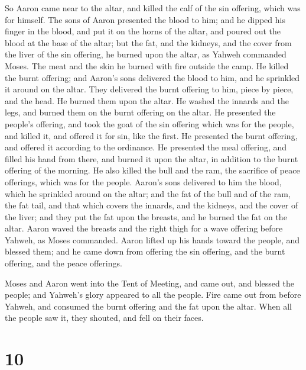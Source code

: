  So Aaron came near to the altar, and killed the calf of the
sin offering, which was for himself.  The sons of Aaron
presented the blood to him; and he dipped his finger in the blood, and
put it on the horns of the altar, and poured out the blood at the base
of the altar;  but the fat, and the kidneys, and the cover
from the liver of the sin offering, he burned upon the altar, as Yahweh
commanded Moses.  The meat and the skin he burned with fire
outside the camp.  He killed the burnt offering; and
Aaron's sons delivered the blood to him, and he sprinkled it around on
the altar.  They delivered the burnt offering to him, piece
by piece, and the head. He burned them upon the altar.  He
washed the innards and the legs, and burned them on the burnt offering
on the altar.  He presented the people's offering, and took
the goat of the sin offering which was for the people, and killed it,
and offered it for sin, like the first.  He presented the
burnt offering, and offered it according to the ordinance. 
He presented the meal offering, and filled his hand from there, and
burned it upon the altar, in addition to the burnt offering of the
morning.  He also killed the bull and the ram, the
sacrifice of peace offerings, which was for the people. Aaron's sons
delivered to him the blood, which he sprinkled around on the altar;
 and the fat of the bull and of the ram, the fat tail, and
that which covers the innards, and the kidneys, and the cover of the
liver;  and they put the fat upon the breasts, and he
burned the fat on the altar.  Aaron waved the breasts and
the right thigh for a wave offering before Yahweh, as Moses commanded.
 Aaron lifted up his hands toward the people, and blessed
them; and he came down from offering the sin offering, and the burnt
offering, and the peace offerings.

 Moses and Aaron went into the Tent of Meeting, and came
out, and blessed the people; and Yahweh's glory appeared to all the
people.  Fire came out from before Yahweh, and consumed the
burnt offering and the fat upon the altar. When all the people saw it,
they shouted, and fell on their faces.

\hypertarget{section-9}{%
\section{10}\label{section-9}}

